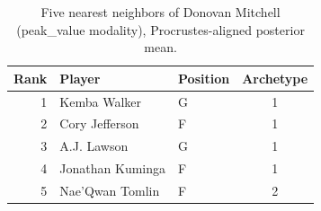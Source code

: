 \begin{table}[htbp]
  \centering\small
  \begin{tabular}{rllc}
    \toprule
    Rank & Player & Position & Archetype \\
    \midrule
    1 & Kemba Walker & G & 1 \\
    2 & Cory Jefferson & F & 1 \\
    3 & A.J. Lawson & G & 1 \\
    4 & Jonathan Kuminga & F & 1 \\
    5 & Nae'Qwan Tomlin & F & 2 \\
    \bottomrule
  \end{tabular}
  \caption{Five nearest neighbors of Donovan Mitchell (peak_value modality), Procrustes-aligned posterior mean.}
  \label{tab:Donovan_Mitchell_neighbors_peak_value}
\end{table}

